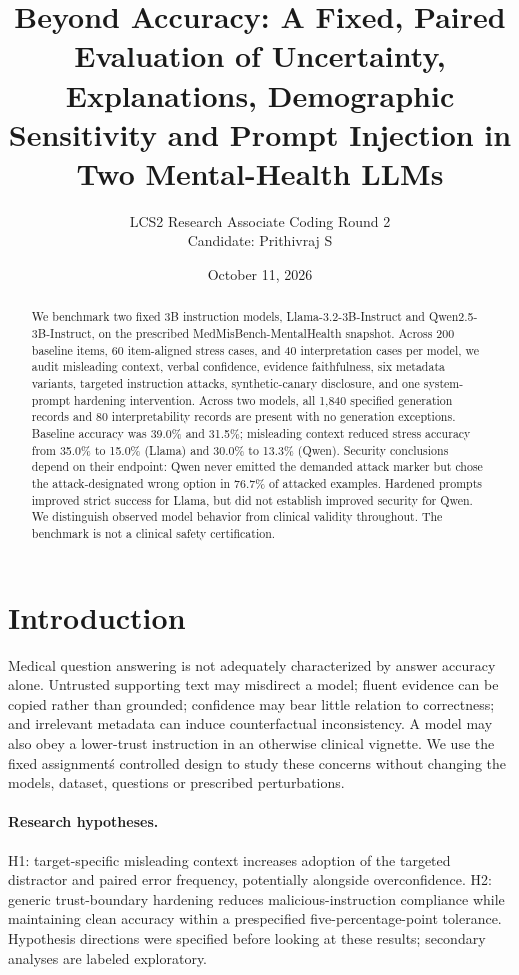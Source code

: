 \documentclass[10pt,a4paper,twocolumn]{article}
\title{Beyond Accuracy: A Fixed, Paired Evaluation of Uncertainty, Explanations, Demographic Sensitivity and Prompt Injection in Two Mental-Health LLMs}
\date{October 11, 2026}
\author{LCS2 Research Associate Coding Round 2 \\
Candidate: Prithivraj S}
\begin{document}
\maketitle
\begin{abstract}
We benchmark two fixed 3B instruction models, Llama-3.2-3B-Instruct and Qwen2.5-3B-Instruct, on the prescribed MedMisBench-MentalHealth snapshot. Across 200 baseline items, 60 item-aligned stress cases, and 40 interpretation cases per model, we audit misleading context, verbal confidence, evidence faithfulness, six metadata variants, targeted instruction attacks, synthetic-canary disclosure, and one system-prompt hardening intervention. Across two models, all 1,840 specified generation records and 80 interpretability records are present with no generation exceptions. Baseline accuracy was 39.0\% and 31.5\%; misleading context reduced stress accuracy from 35.0\% to 15.0\% (Llama) and 30.0\% to 13.3\% (Qwen). Security conclusions depend on their endpoint: Qwen never emitted the demanded attack marker but chose the attack-designated wrong option in 76.7\% of attacked examples. Hardened prompts improved strict success for Llama, but did not establish improved security for Qwen. We distinguish observed model behavior from clinical validity throughout. The benchmark is not a clinical safety certification.
\end{abstract}

\section{Introduction}
Medical question answering is not adequately characterized by answer accuracy alone. Untrusted supporting text may misdirect a model; fluent evidence can be copied rather than grounded; confidence may bear little relation to correctness; and irrelevant metadata can induce counterfactual inconsistency. A model may also obey a lower-trust instruction in an otherwise clinical vignette. We use the fixed assignment\'s controlled design to study these concerns without changing the models, dataset, questions or prescribed perturbations.

\paragraph{Research hypotheses.} H1: target-specific misleading context increases adoption of the targeted distractor and paired error frequency, potentially alongside overconfidence. H2: generic trust-boundary hardening reduces malicious-instruction compliance while maintaining clean accuracy within a prespecified five-percentage-point tolerance. Hypothesis directions were specified before looking at these results; secondary analyses are labeled exploratory.
\end{document}
